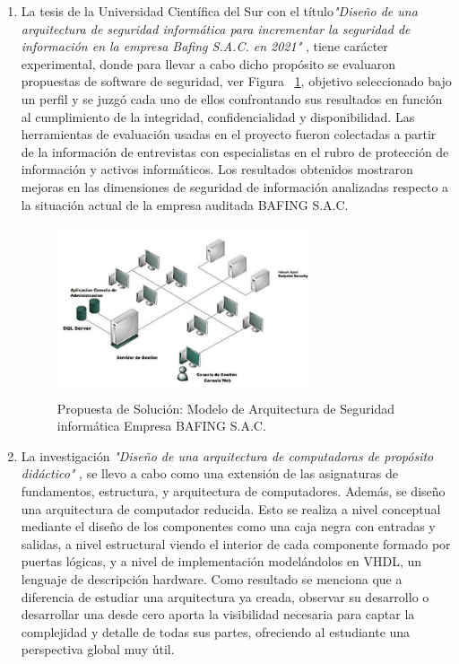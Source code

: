 \documentclass[10pt,conference]{IEEEtran}
\begin{document}
\begin {enumerate}
\item La tesis de la Universidad Científica del Sur con el título\textit{"Diseño de una arquitectura de seguridad informática para incrementar la seguridad de información en la empresa Bafing S.A.C. en 2021"} \citep{asurza2022diseno}, tiene carácter experimental, donde para llevar a cabo dicho propósito se evaluaron propuestas de software de seguridad, ver Figura ~\ref{farq}, objetivo seleccionado bajo un perfil y se juzgó cada uno de ellos confrontando sus resultados en función al cumplimiento de la integridad, confidencialidad y disponibilidad. Las herramientas de evaluación usadas en el proyecto fueron colectadas a partir de la información de entrevistas con especialistas en el rubro de protección de información y activos informáticos. Los resultados obtenidos mostraron mejoras en las dimensiones de seguridad de información analizadas respecto a la situación actual de la empresa auditada BAFING S.A.C.

\begin{figure}[H]
 \begin{center}
       \includegraphics[width=7.5cm, height=5cm]{figuras/arq.PNG}
      \caption{Propuesta de Solución: Modelo de Arquitectura de Seguridad informática Empresa BAFING S.A.C.}
      \label{farq} 
      \end{center}
\end{figure}

\item La investigación \textit{"Diseño de una arquitectura de computadoras de propósito didáctico"} \citep{upm69893}, se llevo a cabo como una extensión de las asignaturas de fundamentos, estructura, y arquitectura de computadores. Además, se diseño una arquitectura de computador reducida. Esto se realiza a nivel conceptual mediante el diseño de los componentes como una caja negra con entradas y salidas, a nivel estructural viendo el interior de cada componente formado por puertas lógicas, y a nivel de implementación modelándolos en VHDL, un lenguaje de descripción hardware. Como resultado se menciona que a diferencia de estudiar una arquitectura ya creada, observar su desarrollo o desarrollar una desde cero aporta la visibilidad necesaria para captar la complejidad y detalle de todas sus partes, ofreciendo al estudiante una perspectiva global muy útil.


\end{enumerate}
\end{document}
